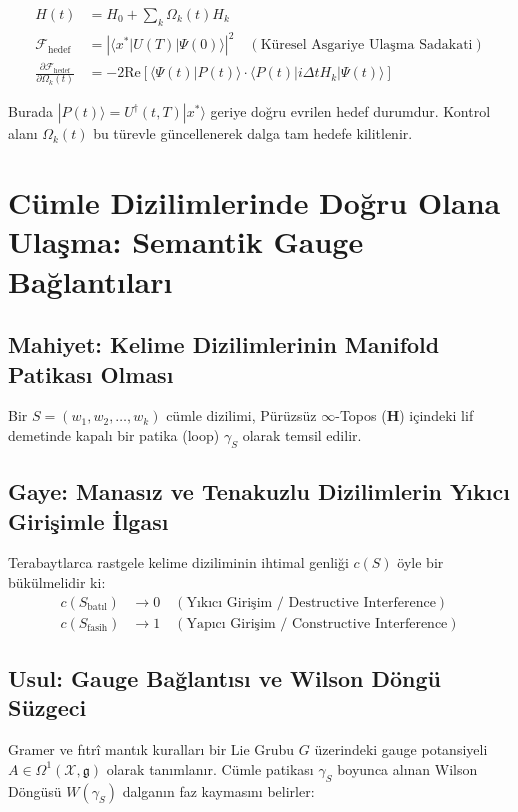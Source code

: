 \documentclass[11pt, a4paper]{article}
\begin{document}
\begin{align}
H(t) &= H_0 + \sum_k \Omega_k(t) H_k \\
\mathcal{F}_{\text{hedef}} &= \left| \langle x^* | U(T) | \Psi(0) \rangle \right|^2 \quad (\text{Küresel Asgariye Ulaşma Sadakati}) \\
\frac{\partial \mathcal{F}_{\text{hedef}}}{\partial \Omega_k(t)} &= -2 \text{Re} \left[ \langle \Psi(t) | P(t) \rangle \cdot \langle P(t) | i \Delta t H_k | \Psi(t) \rangle \right]
\end{align}

Burada $|P(t)\rangle = U^\dagger(t, T) |x^*\rangle$ geriye doğru evrilen hedef durumdur. Kontrol alanı $\Omega_k(t)$ bu türevle güncellenerek dalga tam hedefe kilitlenir.

\section{Cümle Dizilimlerinde Doğru Olana Ulaşma: Semantik Gauge Bağlantıları}

\subsection{Mahiyet: Kelime Dizilimlerinin Manifold Patikası Olması}
Bir $S = (w_1, w_2, \dots, w_k)$ cümle dizilimi, Pürüzsüz $\infty$-Topos ($\mathbf{H}$) içindeki lif demetinde kapalı bir patika (loop) $\gamma_S$ olarak temsil edilir.

\subsection{Gaye: Manasız ve Tenakuzlu Dizilimlerin Yıkıcı Girişimle İlgası}
Terabaytlarca rastgele kelime diziliminin ihtimal genliği $c(S)$ öyle bir bükülmelidir ki:
\begin{align}
c(S_{\text{batıl}}) &\to 0 \quad (\text{Yıkıcı Girişim / Destructive Interference}) \\
c(S_{\text{fasih}}) &\to 1 \quad (\text{Yapıcı Girişim / Constructive Interference})
\end{align}

\subsection{Usul: Gauge Bağlantısı ve Wilson Döngü Süzgeci}
Gramer ve fıtrî mantık kuralları bir Lie Grubu $G$ üzerindeki gauge potansiyeli $A \in \Omega^1(\mathcal{X}, \mathfrak{g})$ olarak tanımlanır. Cümle patikası $\gamma_S$ boyunca alınan Wilson Döngüsü $W(\gamma_S)$ dalganın faz kaymasını belirler:
\end{document}
